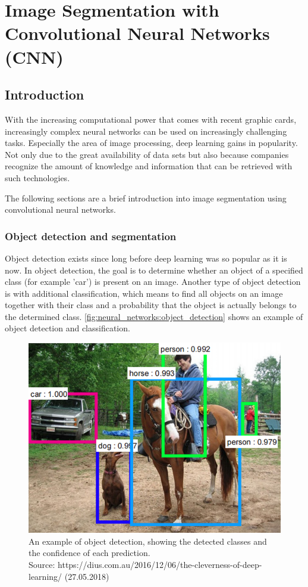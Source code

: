
\chapter{Image Segmentation with Convolutional Neural Networks (CNN)}\label{chp:segmentation_with_neural_networks}
\section{Introduction}
With the increasing computational power that comes with recent graphic cards, increasingly complex neural networks can be used on increasingly challenging tasks. Especially the area of image processing, deep learning gains in popularity. Not only due to the great availability of data sets but also because companies recognize the amount of knowledge and information that can be retrieved with such technologies.

The following sections are a brief introduction into image segmentation using convolutional neural networks.

\subsection{Object detection and segmentation}
Object detection exists since long before deep learning was so popular as it is now. In object detection, the goal is to determine whether an object of a specified class (for example 'car') is present on an image. Another type of object detection is with additional classification, which means to find all objects on an image together with their class and a probability that the object is actually belongs to the determined class. \autoref{fig:neural_networks:object_detection} shows an example of object detection and classification.

\begin{figure}[H]
    \centering
	\includegraphics[width=0.6\linewidth]{chapters/neural_networks/images/object_detection.png}
	\caption{An example of object detection, showing the detected classes and the confidence of each prediction.\\ Source: https://dius.com.au/2016/12/06/the-cleverness-of-deep-learning/ (27.05.2018)}
	\label{fig:neural_networks:object_detection}
\end{figure}

